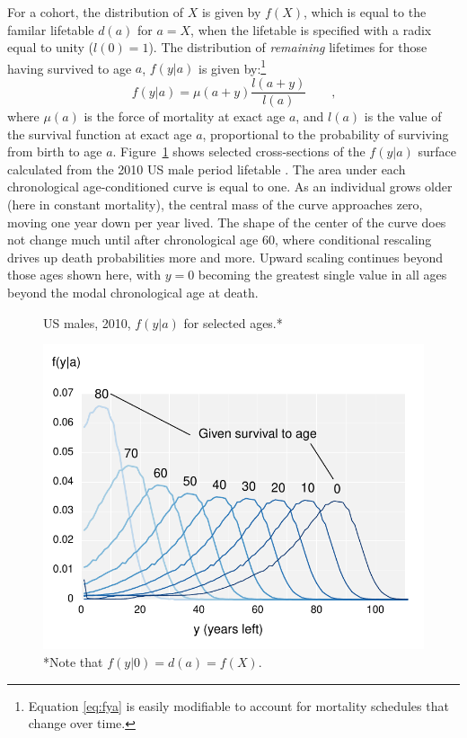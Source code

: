 \documentclass{article}
\newcommand{\tc}{\quad\quad\text{,}}
\begin{document}
For a cohort, the distribution of $X$ is given by $f(X)$, which is equal to the familar lifetable
$d(a)$ for $a = X$, when the lifetable is specified with a radix equal
to unity ($l(0)=1$).
The distribution of \textit{remaining} lifetimes for those having survived to age $a$, $f(y|a)$ is
given by:\footnote{Equation \eqref{eq:fya} is easily modifiable to account for
mortality schedules that change over time.}
\begin{equation}
\label{eq:fya}
f(y|a) = \mu(a+y) \frac{l(a+y)}{l(a)} \tc
\end{equation}
where $\mu(a)$ is the force of mortality at exact age $a$, and $l(a)$ is
the value of the survival function at exact age $a$, proportional to the
probability of surviving from birth to age $a$. Figure~\ref{fig:fya} shows selected
cross-sections of the $f(y|a)$ surface calculated from the 2010 US male period
lifetable . The area under each chronological age-conditioned curve is equal to one.
As an individual grows older (here in constant mortality), the central mass of the
curve approaches zero, moving one year down per year lived. The shape of the center of
the curve does not change much until after chronological age 60, where
conditional rescaling drives up death probabilities more and more. Upward
scaling continues beyond those ages shown here, with $y=0$ becoming the greatest
single value in all ages beyond the modal chronological age at death.

 \begin{figure}[h]
\centering
	\caption{US males, 2010, $f(y|a)$ for selected ages.*}
	\label{fig:fya}
	\includegraphics[scale=.8]{Figures/fya.pdf}	
	\caption*{*Note that $f(y|0) = d(a) = f(X)$.}
\end{figure}
\end{document}
